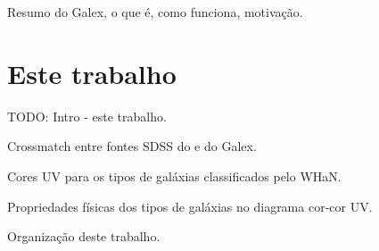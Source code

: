 Resumo do Galex, o que é, como funciona, motivação.



\section{Este trabalho}
\label{sec:Intro:EsteTrab}

TODO: Intro - este trabalho.

Crossmatch entre fontes SDSS do \starlight{} e do Galex.

Cores UV para os tipos de galáxias classificados pelo WHaN.

Propriedades físicas dos tipos de galáxias no diagrama cor-cor UV.

Organização deste trabalho.

